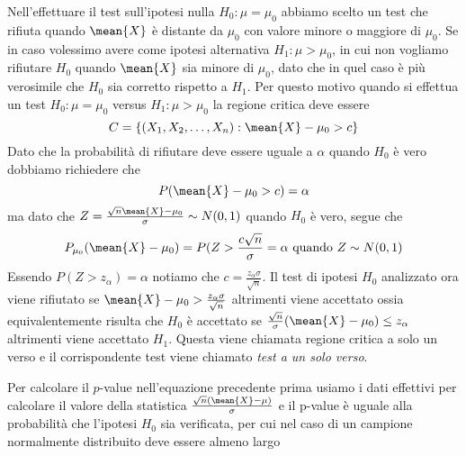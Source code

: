 Nell'effettuare il test sull'ipotesi nulla $H_0:\mu = \mu_0$ abbiamo scelto un test che rifiuta quando $\mean{X}$ è
distante da $\mu_0$ con valore minore o maggiore di $\mu_0$.\newline
Se in caso volessimo avere come ipotesi alternativa $H_1:\mu > \mu_0$, in cui non vogliamo rifiutare $H_0$ quando
$\mean{X}$ sia minore di $\mu_0$, dato che in quel caso è più verosimile che $H_0$ sia corretto rispetto a $H_1$.\newline
Per questo motivo quando si effettua un test $H_0:\mu = \mu_0$ versus $H_1:\mu > \mu_0$ la regione critica deve essere
\[ C = \{(X_1, X_2, \dots, X_n) : \mean{X} - \mu_0 > c \} \]
Dato che la probabilità di rifiutare deve essere uguale a $\alpha$ quando $H_0$ è vero dobbiamo richiedere che 
\[ P(\mean{X} - \mu_0 > c) = \alpha \]
ma dato che $Z = \frac{\sqrt{n} \mean{X} - \mu_0}{\sigma} \sim N(0, 1)$ quando $H_0$ è vero, segue che
\[ P_{\mu_0}(\mean{X} - \mu_0) = P(Z > \frac{c \sqrt{n}}{\sigma} = \alpha \mbox{ quando } Z \sim N(0, 1) \]
Essendo $P(Z > z_{\alpha}) = \alpha$ notiamo che $c = \frac{z_{\alpha} \sigma}{\sqrt{n}}$.
Il test di ipotesi $H_0$ analizzato ora viene rifiutato se $\mean{X} - \mu_0 > \frac{z_{\alpha}\sigma}{\sqrt{n}}$
altrimenti viene accettato ossia equivalentemente risulta che
$H_0$ è accettato se $\frac{\sqrt{n}}{\sigma}(\mean{X} - \mu_0) \leq z_{\alpha}$ altrimenti viene accettato $H_1$.
Questa viene chiamata regione critica a solo un verso e il corrispondente test viene chiamato \emph{test a un solo verso}.

Per calcolare il $p$-value nell'equazione precedente prima usiamo i dati effettivi per calcolare il valore della
statistica $\frac{\sqrt{n} (\mean{X} - \mu)}{\sigma}$ e il p-value è uguale alla probabilità che l'ipotesi $H_0$ sia
verificata, per cui nel caso di un campione normalmente distribuito deve essere almeno largo 

